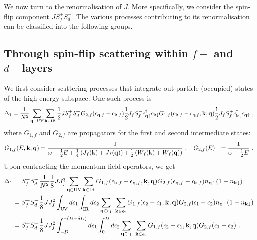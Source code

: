 \documentclass[%
reprint,
superscriptaddress,
groupedaddress,
superscriptaddress,
onecolumn,
]{revtex4-2}
\begin{document}
We now turn to the renormalisation of \(J\). More specifically, we consider the spin-flip component \(J S_f^+ S_d^-\). The various processes contributing to its renormalisation can be classified into the following groups.
\subsection{Through spin-flip scattering within \(f-\) and \(d-\)layers}
We first consider scattering processes that integrate out particle (occupied) states of the high-energy subspace. One such process is
\begin{equation}\begin{aligned}
	\Delta_{1} = \frac{1}{N^2}\sum_{{\bf q} \in \text{UV}}\sum_{{\bf k} \in \text{IR}}\frac{1}{2}J S_f^+ S_d^- G_{2,f}(\epsilon_{{\bf q},f} - \epsilon_{{\bf k},f}) \frac{1}{2}J_f S_f^- c^\dagger_{{\bf q}\uparrow}c_{{\bf k}\downarrow} G_{1,f}(\epsilon_{{\bf k},f} - \epsilon_{{\bf q},f}, {\bf k}, {\bf q}) \frac{1}{2}J_fS_f^+ c^\dagger_{{\bf k}\downarrow}c_{{\bf q}\uparrow}~,
\end{aligned}\end{equation}
where \(G_{1,f}\) and \(G_{2,f}\) are propagators for the first and second intermediate states:
\begin{equation}\begin{aligned}
	G_{1,f}(E, {\bf k}, {\bf q}) &= \frac{1}{\omega - \frac{1}{2}E + \frac{1}{4}\left(J_f({\bf k}) + J_f({\bf q})\right) + \frac{1}{2}\left(W_f({\bf k}) + W_f({\bf q})\right)}~,\quad G_{2,f}(E) &= \frac{1}{\omega - \frac{1}{2}E}~.
\end{aligned}\end{equation}
Upon contracting the momentum field operators, we get
\begin{equation}\begin{aligned}
	\Delta_{1} &= S_f^+ S_d^- \frac{1}{N^2}\frac{1}{8}J J_f^2 \sum_{{\bf q} \in \text{UV}}\sum_{{\bf k} \in \text{IR}}G_{1,f}(\epsilon_{{\bf k},f} - \epsilon_{{\bf q},f}, {\bf k}, {\bf q}) G_{2,f}(\epsilon_{{\bf q},f} - \epsilon_{{\bf k},f}) n_{{\bf q}\uparrow}\left(1 - n_{{\bf k}\downarrow}\right)\\
			   &= S_f^+ S_d^- \frac{1}{8}J J_f^2 \int_\text{UV} d\epsilon_1 \int_\text{IR} d\epsilon_2 \sum_{{\bf q} \in \epsilon_1}~\sum_{{\bf k} \in \epsilon_2}G_{1,f}(\epsilon_2 - \epsilon_1, {\bf k}, {\bf q}) G_{2,f}(\epsilon_1 - \epsilon_2) n_{{\bf q}\uparrow}\left(1 - n_{{\bf k}\downarrow}\right) \\ 
			   &= S_f^+ S_d^- \frac{1}{8}J J_f^2 \int_{-D}^{-(D - \delta D)} d\epsilon_1 \int_0^D d\epsilon_2 \sum_{{\bf q} \in \epsilon_1}~\sum_{{\bf k} \in \epsilon_2}G_{1,f}(\epsilon_2 - \epsilon_1, {\bf k}, {\bf q}) G_{2,f}(\epsilon_1 - \epsilon_2)~.
\end{aligned}\end{equation}
\end{document}
